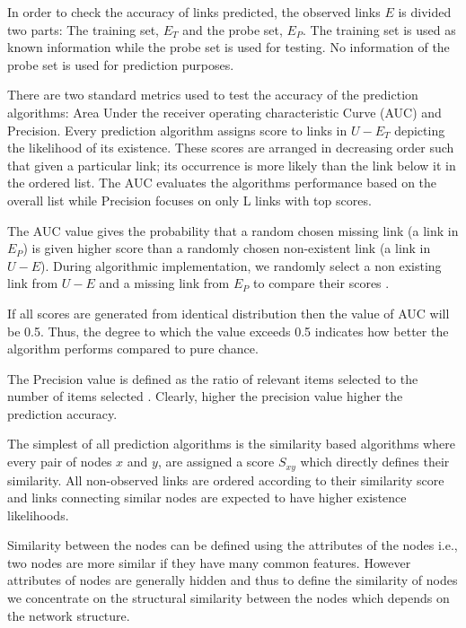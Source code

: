 In order to check the accuracy of links predicted, the observed links $E$ is divided two parts: The training set, $E_T$ and the probe set, $E_P$. The training set is used as known information while the probe set is used for testing. No information of the probe set is used for prediction purposes. 

There are two standard metrics used to test the accuracy of the prediction algorithms: Area Under the receiver operating characteristic Curve (AUC) and Precision. Every prediction algorithm assigns score to links in $U-E_T$ depicting the likelihood of its existence. These scores are arranged in decreasing order such that given a particular link; its occurrence is more likely than the link below it in the ordered list. The AUC evaluates the algorithms performance based on the overall list while Precision focuses on only L links with top scores.
	

The AUC value gives the probability that a random chosen missing link (a link in $E_P$) is given higher score than a randomly chosen non-existent link (a link in $U-E$). During algorithmic implementation, we randomly select a non existing link from $U-E$ and a missing link from $E_P$ to compare their scores \cite{lu2011}. 

If all scores are generated from identical distribution then the value of AUC will be 0.5. Thus, the degree to which the value exceeds 0.5 indicates how better the algorithm performs compared to pure chance. 

\pagebreak
{}

The Precision value is defined as the ratio of relevant items selected to the number of items selected \cite{lu2011}. Clearly, higher the precision value higher the prediction accuracy.



The simplest of all prediction algorithms is the similarity based algorithms where every pair of nodes $x$ and $y$, are assigned a score $S_{xy}$ which directly defines their similarity. All non-observed links are ordered according to their similarity score and links connecting similar nodes are expected to have higher existence likelihoods. 

Similarity between the nodes can be defined using the attributes of the nodes i.e., two nodes are more similar if they have many common features. However attributes of nodes are generally hidden and thus to define the similarity of nodes we concentrate on the structural similarity between the nodes which depends on the network structure.

